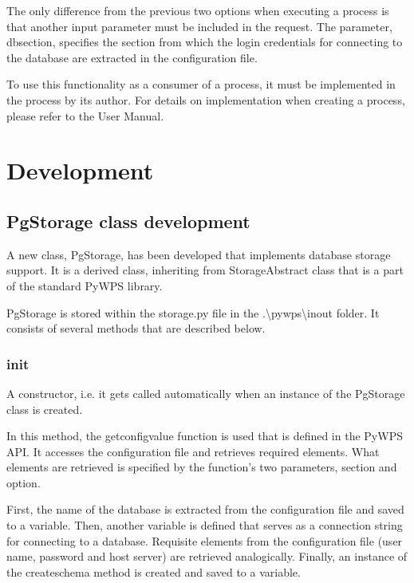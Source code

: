 The only difference from the previous two options when executing a process is that another input parameter must be included in the request. The parameter, db\textunderscore section, specifies the section from which the login credentials for connecting to the database are extracted in the configuration file.

To use this functionality as a consumer of a process, it must be implemented in the process by its author. For details on implementation when creating a process, please refer to the User Manual.


\section{Development} 

\subsection{PgStorage class development} 

A new class, PgStorage, has been developed that implements database storage support. It is a derived class, inheriting from StorageAbstract class that is a part of the standard PyWPS library. 

PgStorage is stored within the storage.py file in the .\textbackslash pywps\textbackslash inout folder. It consists of several methods that are described below. 

\subsubsection{\textunderscore \textunderscore init\textunderscore \textunderscore } 
A constructor, i.e. it gets called automatically when an instance of the PgStorage class is created. 

In this method, the get\textunderscore config\textunderscore value function is used that is defined in the PyWPS API. It accesses the configuration file and retrieves required elements. What elements are retrieved is specified by the function's two parameters, section and option.

First, the name of the database is extracted from the configuration file and saved to a variable. Then, another variable is defined that serves as a connection string for connecting to a database. Requisite elements from the configuration file (user name, password and host server) are retrieved analogically. Finally, an instance of the create\textunderscore schema method is created and saved to a variable.

